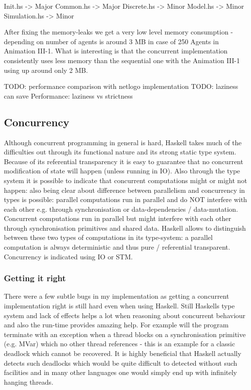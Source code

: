 Init.hs       -> Major
Common.hs	  -> Major
Discrete.hs	  -> Minor
Model.hs	  -> Minor
Simulation.hs -> Minor

After fixing the memory-leaks we get a very low level memory consumption - depending on number of agents is around 3 MB in case of 250 Agents in Animation III-1. What is interesting is that the concurrent implementation consistently uses less memory than the sequential one with the Animation III-1 using up around only 2 MB.

TODO: performance comparison with netlogo implementation
TODO: laziness can save Performance: laziness vs strictness

\subsection{Concurrency}
Although concurrent programming in general is hard, Haskell takes much of the difficulties out through its functional nature and its strong static type system. Because of its referential transparency it is easy to guarantee that no concurrent modification of state will happen (unless running in IO). Also through the type system it is possible to indicate that concurrent computations might or might not happen: also being clear about difference between parallelism and concurrency in types is possible: parallel computations run in parallel and do NOT interfere with each other e.g. through synchronisation or data-dependencies / data-mutation. Concurrent computations run in parallel but might interfere with each other through synchronisation primitives and shared data. Haskell allows to distinguish between these two types of computations in its type-system: a parallel computation is always deterministic and thus pure / referential transparent. Concurrency is indicated using IO or STM.

\subsubsection{Getting it right}
There were a few subtle bugs in my implementation as getting a concurrent implementation right is still hard even when using Haskell. Still Haskells type system and lack of effects helps a lot when reasoning about concurrent behaviour and also the run-time provides amazing help. For example will the program terminate with an exception when a thread blocks on a synchronisation primitive (e.g. MVar) which no other thread references - this is an example for a classic deadlock which cannot be recovered. It is highly beneficial that Haskell actually detects such deadlocks which would be quite difficult to detected without such facilities and in many other languages one would simply end up with infinitely hanging threads.

